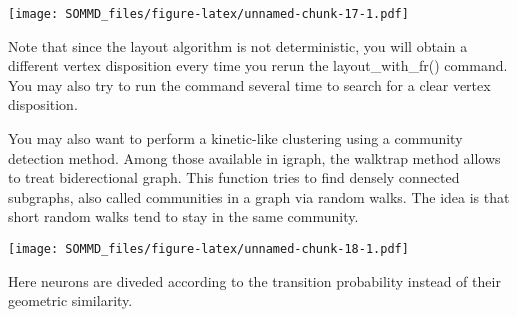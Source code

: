 \documentclass[
]{article}
\newenvironment{Shaded}{\begin{snugshade}}{\end{snugshade}}
\newcommand{\AttributeTok}[1]{\textcolor[rgb]{0.77,0.63,0.00}{#1}}
\newcommand{\DecValTok}[1]{\textcolor[rgb]{0.00,0.00,0.81}{#1}}
\newcommand{\FloatTok}[1]{\textcolor[rgb]{0.00,0.00,0.81}{#1}}
\newcommand{\FunctionTok}[1]{\textcolor[rgb]{0.00,0.00,0.00}{#1}}
\newcommand{\NormalTok}[1]{#1}
\newcommand{\OtherTok}[1]{\textcolor[rgb]{0.56,0.35,0.01}{#1}}
\newcommand{\SpecialCharTok}[1]{\textcolor[rgb]{0.00,0.00,0.00}{#1}}
\newcommand{\StringTok}[1]{\textcolor[rgb]{0.31,0.60,0.02}{#1}}
\begin{document}
\texttt{[image: SOMMD\_files/figure-latex/unnamed-chunk-17-1.pdf]}

Note that since the layout algorithm is not deterministic, you will
obtain a different vertex disposition every time you rerun the
layout\_with\_fr() command. You may also try to run the command several
time to search for a clear vertex disposition.

You may also want to perform a kinetic-like clustering using a community
detection method. Among those available in igraph, the walktrap method
allows to treat biderectional graph. This function tries to find densely
connected subgraphs, also called communities in a graph via random
walks. The idea is that short random walks tend to stay in the same
community.

\begin{Shaded}
\end{Shaded}

\texttt{[image: SOMMD\_files/figure-latex/unnamed-chunk-18-1.pdf]}

Here neurons are diveded according to the transition probability instead
of their geometric similarity.
\end{document}
